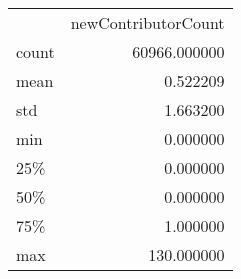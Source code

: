\begin{tabular}{lr}
 & newContributorCount \\
count & 60966.000000 \\
mean & 0.522209 \\
std & 1.663200 \\
min & 0.000000 \\
25\% & 0.000000 \\
50\% & 0.000000 \\
75\% & 1.000000 \\
max & 130.000000 \\
\end{tabular}
